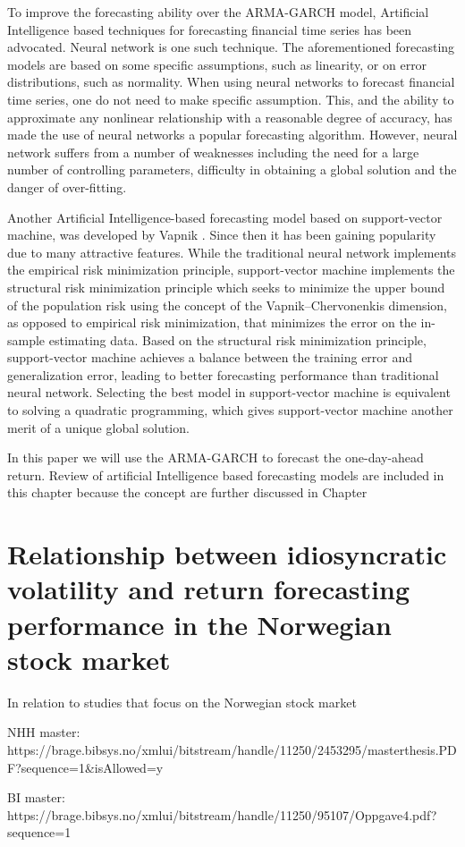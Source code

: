 To improve the forecasting ability over the ARMA-GARCH model, Artificial Intelligence based techniques for forecasting financial time series has been advocated. Neural network is one such technique. The aforementioned forecasting models are based on some specific assumptions, such as linearity, or on error distributions, such as normality. When using neural networks to forecast financial time series, one do not need to make specific assumption. This, and the ability to approximate any nonlinear relationship with a reasonable degree of accuracy, has made the use of neural networks a popular forecasting algorithm. However, neural network suffers from a number of weaknesses including the need for a large number of controlling parameters, difficulty in obtaining a global solution and the danger of over-fitting.

Another Artificial Intelligence-based forecasting model based on support-vector machine, was developed by Vapnik \cite{Vapnik1}\cite{Vapnik2}. Since then it has been gaining popularity due to many attractive features. While the traditional neural network implements the empirical risk minimization principle, support-vector machine implements the structural risk minimization principle which seeks to minimize the upper bound of the population risk using the concept of the Vapnik–Chervonenkis dimension, as opposed to empirical risk minimization, that minimizes the error on the in-sample estimating data. Based on the structural risk minimization principle, support-vector machine achieves a balance between the training error and generalization error, leading to better forecasting performance than traditional neural network. Selecting the best model in support-vector machine is equivalent to solving a quadratic programming, which gives support-vector machine another merit of a unique global solution. 

In this paper we will use the ARMA-GARCH to forecast the one-day-ahead return. Review of artificial Intelligence based forecasting models are included in this chapter because the concept are further discussed in Chapter \label{FutureWork}



\section*{Relationship between idiosyncratic volatility and return forecasting performance in the Norwegian stock market}

In relation to studies that focus on the Norwegian stock market


NHH master: https://brage.bibsys.no/xmlui/bitstream/handle/11250/2453295/masterthesis.PDF?sequence=1&isAllowed=y

BI master: https://brage.bibsys.no/xmlui/bitstream/handle/11250/95107/Oppgave4.pdf?sequence=1
